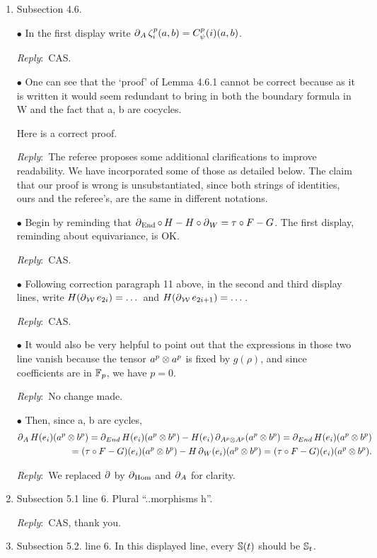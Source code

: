 \documentclass{amsart}
\newcommand{\ar}{\medskip\noindent\textit{Reply}:\ }
\def\subitem{\medskip\noindent$\bullet$ }
\begin{document}
\begin{enumerate}
	\item Subsection 4.6.

	\subitem In the first display write $\operatorname{\partial}_A \zeta_i^p(a,b) = C_\psi^p(i)(a, b)$.

	\ar CAS.

	\subitem One can see that the ‘proof’ of Lemma 4.6.1 cannot be correct because as it is written it
	would seem redundant to bring in both the boundary formula in W and the fact that a, b
	are cocycles.

	\medskip\noindent Here is a correct proof.

	\ar The referee proposes some additional clarifications to improve readability.
	We have incorporated some of those as detailed below.
	The claim that our proof is wrong is unsubstantiated, since both strings of identities, ours and the referee's, are the same in different notations.

	\subitem Begin by reminding that $\operatorname{\partial}_{\mathrm{End}} \mathbin{\circ}\, H - H \mathbin{\circ} \operatorname{\partial}_{W} = \tau \mathbin{\circ} F - G$.
	The first display, reminding about equivariance, is OK.

	\ar CAS.

	\subitem Following correction paragraph 11 above, in the second and third display lines, write $H(\operatorname{\partial}_{\mathcal{W}} e_{2i}) = \dots$ and $H(\operatorname{\partial}_{\mathcal{W}} e_{2i+1}) = \dots$.

	\ar CAS.

	\subitem It would also be very helpful to point out that the expressions in those two line vanish
	because the tensor $a^p \otimes a^p$ is fixed by $g(\rho)$, and since coefficients are in ${\mathbb{F}_p}$, we have $p = 0$.

	\ar No change made.

	\subitem Then, since a, b are cycles,
	\[
	\begin{split}
		\operatorname{\partial}_A H(e_i)(a^p \otimes b^p) = \operatorname{\partial}_{End} H(e_i)(a^p \otimes b^p) - H(e_i)\operatorname{\partial}_{A^p \otimes A^p} (a^p \otimes b^p) = \operatorname{\partial}_{End} H(e_i)(a^p \otimes b^p) \\
		= (\tau \mathbin{\circ} F - G)(e_i)(a^p \otimes b^p) - H\operatorname{\partial}_W (e_i)(a^p \otimes b^p) = (\tau \mathbin{\circ} F - G)(e_i )(a^p \otimes b^p).
	\end{split}
	\]

	\ar We replaced $\operatorname{\partial}$ by $\operatorname{\partial}_{\mathrm{Hom}}$ and $\operatorname{\partial}_A$ for clarity.

	\item Subsection 5.1 line 6. Plural “..morphisms h”.

	\ar CAS, thank you.

	\item Subsection 5.2. line 6. In this displayed line, every $\mathbb{S}(t)$ should be $\mathbb{S}_t$.


\end{enumerate}
\end{document}
